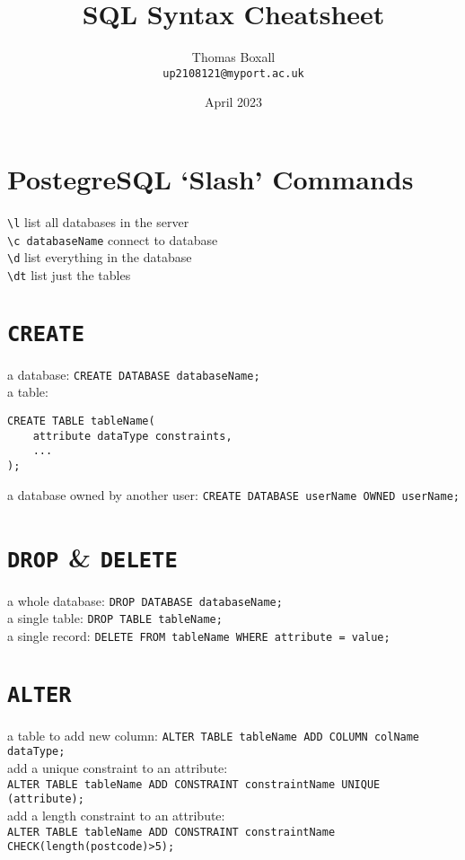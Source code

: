 \documentclass[a4paper,11pt]{article}
\title{SQL Syntax Cheatsheet}
\author{Thomas Boxall\\ \texttt{up2108121@myport.ac.uk}}
\date{April 2023}
\begin{document}
\maketitle
\thispagestyle{fancy}

\section{PostegreSQL `Slash' Commands}
\verb|\l| list all databases in the server\\
\verb|\c databaseName| connect to database\\
\verb|\d| list everything in the database\\
\verb|\dt| list just the tables

\section{\texttt{CREATE}}
a database: \verb|CREATE DATABASE databaseName;|\\
a table: 
\begin{verbatim}
CREATE TABLE tableName(
    attribute dataType constraints,
    ...
);
\end{verbatim}
a database owned by another user: \verb|CREATE DATABASE userName OWNED userName;|

\section{\texttt{DROP} \& \texttt{DELETE}}
a whole database: \verb|DROP DATABASE databaseName;|\\
a single table: \verb|DROP TABLE tableName;|\\
a single record: \verb|DELETE FROM tableName WHERE attribute = value;|

\section{\texttt{ALTER}}
a table to add new column: \verb|ALTER TABLE tableName ADD COLUMN colName dataType;|\\
add a unique constraint to an attribute:\\ \verb|ALTER TABLE tableName ADD CONSTRAINT constraintName UNIQUE (attribute);|\\
add a length constraint to an attribute:\\ \verb|ALTER TABLE tableName ADD CONSTRAINT constraintName CHECK(length(postcode)>5);|\\
\end{document}
